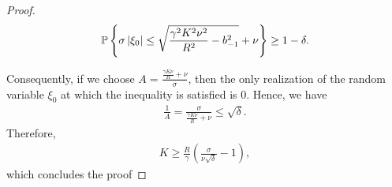 \documentclass{article}
\begin{document}
\begin{proof}
\begin{equation*}
        \mathbb{P}\left\{\sigma\left\lvert\xi_0\right\rvert \leq \sqrt{\frac{\gamma^2 K^2 \nu^2}{R^2} - b_{-1}^2} + \nu\right\} \geq 1-\delta.
    \end{equation*}
    
    Consequently, if we choose $A = \frac{\frac{\gamma K \nu}{R} + \nu}{\sigma}$, then the only realization of the random variable $\xi_0$ at which the inequality is satisfied is $0$. Hence, we have
    \begin{align*}
        \frac{1}{A} = \frac{\sigma}{\frac{\gamma K \nu}{R} + \nu} \leq \sqrt{\delta}.
    \end{align*}
    Therefore, 
    \begin{align*}
        K \geq \frac{R}{\gamma}\left(\frac{\sigma}{\nu\sqrt{\delta}} - 1\right),
    \end{align*}
    which concludes the proof 
\end{proof}
\end{document}
